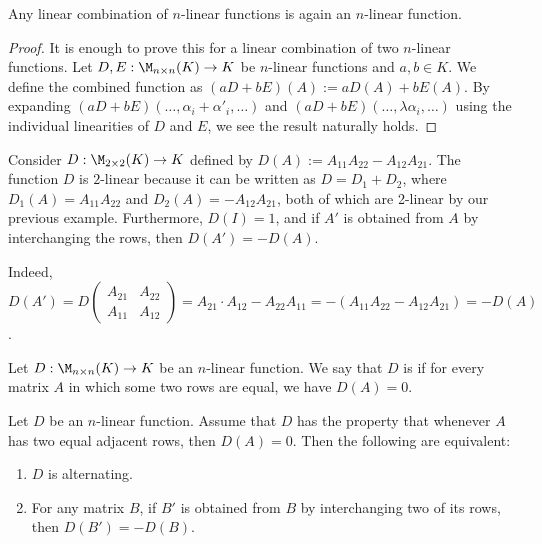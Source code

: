 \begin{lemma}\label{lem:linear_comb_n_linear}
  Any linear combination of $n$-linear functions is again an $n$-linear function.
\end{lemma}

\begin{proof}
  It is enough to prove this for a linear combination of two $n$-linear functions. Let $D, E : \M_{n \times n}(K) \to K$ be $n$-linear functions and $a, b \in K$. We define the combined function as $(aD + bE)(A) := aD(A) + bE(A)$.
  By expanding $(aD+bE)(\dots, \alpha_i + \alpha'_i, \dots)$ and $(aD+bE)(\dots, \lambda \alpha_i, \dots)$ using the individual linearities of $D$ and $E$, we see the result naturally holds.
\end{proof}

\begin{example}\label{ex:2_linear_det}
  Consider $D : \M_{2 \times 2}(K) \to K$ defined by $D(A) := A_{11}A_{22} - A_{12}A_{21}$. The function $D$ is $2$-linear because it can be written as $D = D_1 + D_2$, where $D_1(A) = A_{11}A_{22}$ and $D_2(A) = -A_{12}A_{21}$, both of which are 2-linear by our previous example. Furthermore, $D(I) = 1$, and if $A'$ is obtained from $A$ by interchanging the rows, then $D(A') = -D(A)$.

  Indeed, $D(A') = D\left(\begin{smallmatrix} A_{21} & A_{22} \\ A_{11} & A_{12} \end{smallmatrix}\right) = A_{21} \cdot A_{12} - A_{22}A_{11} = -(A_{11}A_{22} - A_{12}A_{21}) = -D(A)$.
\end{example}

\begin{definition}\label{def:alternating}
  Let $D : \M_{n \times n}(K) \to K$ be an $n$-linear function. We say that $D$ is  if for every matrix $A$ in which some two rows are equal, we have $D(A) = 0$.
\end{definition}

\begin{proposition}\label{prop:alternating_swap}
  Let $D$ be an $n$-linear function. Assume that $D$ has the property that whenever $A$ has two equal adjacent rows, then $D(A) = 0$. Then the following are equivalent:
  \begin{enumerate}
    \item $D$ is alternating.
    \item For any matrix $B$, if $B'$ is obtained from $B$ by interchanging two of its rows, then $D(B') = -D(B)$.
  \end{enumerate}
\end{proposition}

